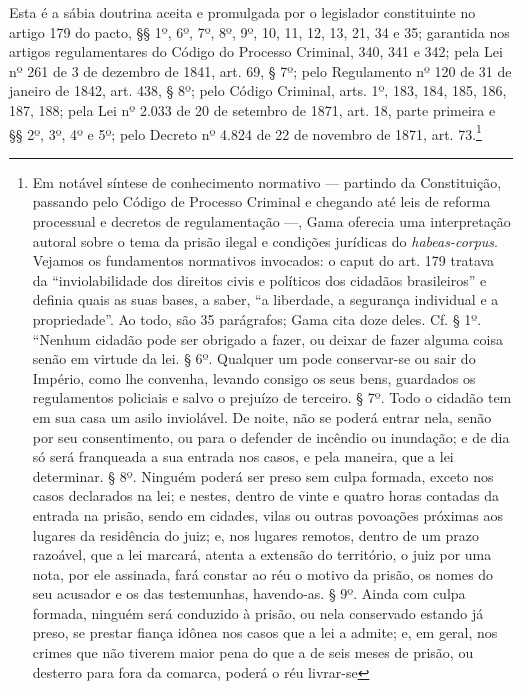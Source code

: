 Esta é a sábia doutrina aceita e promulgada por o legislador
constituinte no artigo 179 do pacto, §§ 1º, 6º, 7º, 8º, 9º, 10, 11, 12,
13, 21, 34 e 35; garantida nos artigos regulamentares do Código do
Processo Criminal, 340, 341 e 342; pela Lei nº 261 de 3 de dezembro de
1841, art. 69, § 7º; pelo Regulamento nº 120 de 31 de janeiro de 1842,
art. 438, § 8º; pelo Código Criminal, arts. 1º, 183, 184, 185, 186, 187,
188; pela Lei nº 2.033 de 20 de setembro de 1871, art. 18, parte
primeira e §§ 2º, 3º, 4º e 5º; pelo Decreto nº 4.824 de 22 de novembro
de 1871, art. 73.\footnote{Em notável síntese de conhecimento
  normativo --- partindo da Constituição, passando pelo Código de Processo
  Criminal e chegando até leis de reforma processual e decretos de
  regulamentação ---, Gama oferecia uma interpretação autoral sobre o
  tema da prisão ilegal e condições jurídicas do \emph{habeas-corpus}.
  Vejamos os fundamentos normativos invocados: o caput do art. 179
  tratava da ``inviolabilidade dos direitos civis e políticos dos
  cidadãos brasileiros'' e definia quais as suas bases, a saber, ``a
  liberdade, a segurança individual e a propriedade''. Ao todo, são 35
  parágrafos; Gama cita doze deles. Cf. § 1º. ``Nenhum cidadão pode ser
  obrigado a fazer, ou deixar de fazer alguma coisa senão em virtude da
  lei. § 6º. Qualquer um pode conservar-se ou sair do Império,
  como lhe convenha, levando consigo os seus bens, guardados os
  regulamentos policiais e salvo o prejuízo de terceiro. § 7º. Todo o
  cidadão tem em sua casa um asilo inviolável. De noite, não se poderá
  entrar nela, senão por seu consentimento, ou para o defender de
  incêndio ou inundação; e de dia só será franqueada a sua entrada nos
  casos, e pela maneira, que a lei determinar. § 8º. Ninguém poderá ser %
  preso sem culpa formada, exceto nos casos declarados na lei; e nestes,
  dentro de vinte e quatro horas contadas da entrada na prisão, sendo em
  cidades, vilas ou outras povoações próximas aos lugares da residência
  do juiz; e, nos lugares remotos, dentro de um prazo razoável, que a
  lei marcará, atenta a extensão do território, o juiz por uma nota, por
  ele assinada, fará constar ao réu o motivo da prisão, os nomes do seu
  acusador e os das testemunhas, havendo-as. § 9º. Ainda com culpa
  formada, ninguém será conduzido à prisão, ou nela conservado estando
  já preso, se prestar fiança idônea nos casos que a lei a admite; e, em
  geral, nos crimes que não tiverem maior pena do que a de seis meses de
  prisão, ou desterro para fora da comarca, poderá o réu livrar-se
}

